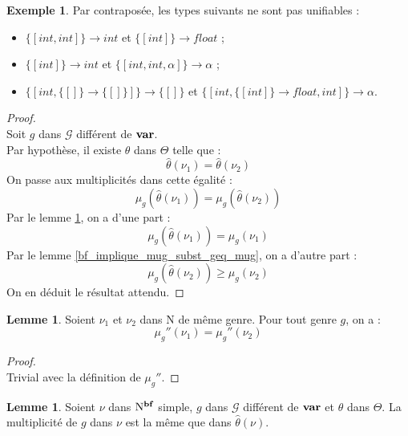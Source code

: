 \documentclass[a4paper]{report}
\newenvironment{preuve} 
  {\begin{proof}~\\} 
  {\end{proof}}
\theoremstyle{definition}
\newtheorem{lemme}[theoreme]{Lemme}
\newtheorem{exemple}[theoreme]{Exemple}
\newcommand{\mset}[1]{\{\![#1]\!\}}
\newcommand{\G}{\mathscr{G}}
\newcommand{\N}{\mathrm{N}}
\begin{document}
\begin{exemple}
  Par contraposée, les types suivants ne sont pas unifiables :
  \begin{itemize}
    \item $\mset{int, int} \rightarrow int$ et $\mset{int} \rightarrow float$ ;
    \item $\mset{int} \rightarrow int$ et $\mset{int, int, \alpha} \rightarrow \alpha$ ;
    \item $\mset{int, \mset{} \rightarrow \mset{}} \rightarrow \mset{}$ et $\mset{int, \mset{int} \rightarrow float, int} \rightarrow \alpha$.
  \end{itemize}
\end{exemple}

\begin{preuve}
  Soit $g$ dans $\G$ différent de $\bold{var}$. \\
  Par hypothèse, il existe $\theta$ dans $\Theta$ telle que :
  \[ \hat\theta (\nu_1) = \hat\theta (\nu_2) \]
  On passe aux multiplicités dans cette égalité :
  \[ \mu_g (\hat\theta (\nu_1)) = \mu_g (\hat\theta (\nu_2)) \]
  Par le lemme \ref{bf_simple_implique_mu_eq_mu_subst}, on a d'une part :
  \[ \mu_g (\hat\theta (\nu_1)) = \mu_g (\nu_1) \]
  Par le lemme \ref{bf_implique_mug_subst_geq_mug}, on a d'autre part :
  \[ \mu_g (\hat\theta (\nu_2)) \geqslant \mu_g (\nu_2) \]
  On en déduit le résultat attendu.
\end{preuve}

\begin{lemme} \label{genre_eq_implique_mug''_eq}
  Soient $\nu_1$ et $\nu_2$ dans $\N$ de même genre. Pour tout genre $g$, on a :
  \[ \mu_g'' (\nu_1) = \mu_g'' (\nu_2) \]
\end{lemme}

\begin{preuve}
  Trivial avec la définition de $\mu_g''$.
\end{preuve}

\begin{lemme} \label{bf_simple_implique_mu_eq_mu_subst}
  Soient $\nu$ dans $\N^{\bold{bf}}$ simple, $g$ dans $\G$ différent de $\bold{var}$ et $\theta$ dans $\Theta$. La multiplicité de $g$ dans $\nu$ est la même que dans $\hat\theta (\nu)$.
\end{lemme}
\end{document}
